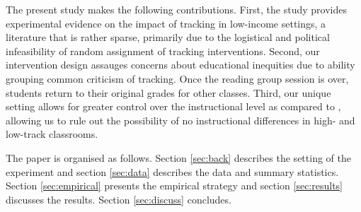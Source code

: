 \documentclass[12pt]{article}
\begin{document}
The present study makes the following contributions. First, the study provides experimental evidence on the impact of tracking in low-income settings, a literature that is rather sparse, primarily due to the logistical and political infeasibility of random assignment of tracking interventions. Second, our intervention design assauges concerns about educational inequities due to ability grouping common criticism of tracking. Once the reading group session is over, students return to their original grades for other classes. Third, our unique setting allows for greater control over the instructional level as compared to \cite{duflo2011peer}, allowing us to rule out the possibility of no instructional differences in high- and low-track classrooms.


The paper is organised as follows. Section \ref{sec:back} describes the setting of the experiment and section \ref{sec:data} describes the data and summary statistics. Section \ref{sec:empirical} presents the empirical strategy and section \ref{sec:results} discusses the results. Section \ref{sec:discuss} concludes. 
\end{document}
